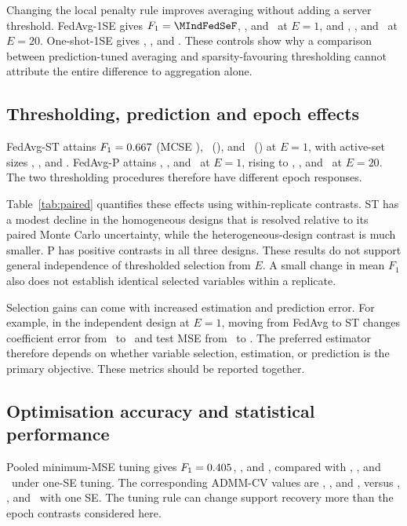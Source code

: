 Changing the local penalty rule improves averaging without adding a server
threshold. FedAvg-1SE gives $F_1=\MIndFedSeF$, \MCorFedSeF, and
\MHetFedSeF\ at $E=1$, and \MIndFedSeTF, \MCorFedSeTF, and
\MHetFedSeTF\ at $E=20$. One-shot-1SE gives \MIndOneSeF,
\MCorOneSeF, and \MHetOneSeF. These controls show why a comparison
between prediction-tuned averaging and sparsity-favouring thresholding
cannot attribute the entire difference to aggregation alone.

\subsection{Thresholding, prediction and epoch effects}

FedAvg-ST attains $F_1=0.667$ (MCSE \MIndStSe), \MCorStF\
(\MCorStSe), and \MHetStF\ (\MHetStSe) at $E=1$, with active-set
sizes \MIndStAct, \MCorStAct, and \MHetStAct. FedAvg-P attains
\MIndProxF, \MCorProxF, and \MHetProxF\ at $E=1$, rising to
\MIndProxTF, \MCorProxTF, and \MHetProxTF\ at $E=20$.
The two thresholding procedures therefore have different epoch responses.

Table~\ref{tab:paired} quantifies these effects using within-replicate
contrasts. ST has a modest decline in the homogeneous designs that is
resolved relative to its paired Monte Carlo uncertainty, while the
heterogeneous-design contrast is much smaller. P has positive contrasts
in all three designs. These results do not support general independence
of thresholded selection from $E$. A small change in mean $F_1$ also does
not establish identical selected variables within a replicate.



Selection gains can come with increased estimation and prediction error.
For example, in the independent design at $E=1$, moving from FedAvg to ST
changes coefficient error from \MIndFedErr\ to \MIndStErr\ and test MSE
from \MIndFedMse\ to \MIndStMse. The preferred estimator therefore
depends on whether variable selection, estimation, or prediction is the
primary objective. These metrics should be reported together.

\subsection{Optimisation accuracy and statistical performance}

Pooled minimum-MSE tuning gives $F_1=0.405$, \MCorPoolF, and
\MHetPoolF, compared with \MIndPoolSeF, \MCorPoolSeF, and
\MHetPoolSeF\ under one-SE tuning. The corresponding ADMM-CV values
are \MIndAdmmCvF, \MCorAdmmCvF, and \MHetAdmmCvF, versus
\MIndAdmmCvSeF, \MCorAdmmCvSeF, and \MHetAdmmCvSeF\ with one SE.
The tuning rule can change support recovery more than the epoch contrasts
considered here.

